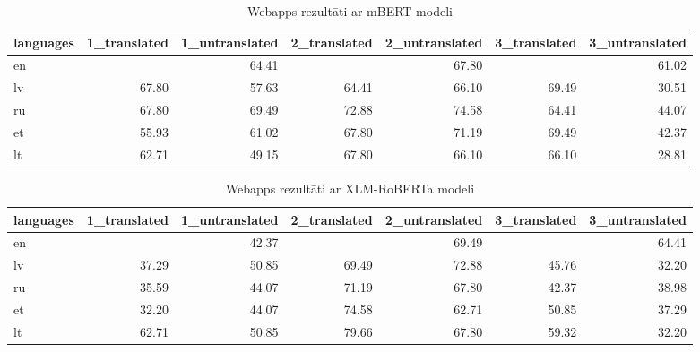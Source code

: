 \begin{table}[htbp]
  \centering
  \caption{Webapps rezultāti ar mBERT modeli}
    \begin{tabular}{lrrrrrr}\toprule
    languages & 1\_translated & 1\_untranslated & 2\_translated & 2\_untranslated & 3\_translated & 3\_untranslated \\\midrule
    en    &       & \cellcolor[rgb]{ .984,  .961,  .973}64.41 &       & \cellcolor[rgb]{ .863,  .902,  .957}67.80 &       & \cellcolor[rgb]{ .984,  .906,  .918}61.02 \\
    lv    & \cellcolor[rgb]{ .863,  .902,  .957}67.80 & \cellcolor[rgb]{ .984,  .855,  .867}57.63 & \cellcolor[rgb]{ .984,  .961,  .973}64.41 & \cellcolor[rgb]{ .988,  .988,  1}66.10 & \cellcolor[rgb]{ .737,  .812,  .914}69.49 & \cellcolor[rgb]{ .973,  .435,  .443}30.51 \\
    ru    & \cellcolor[rgb]{ .863,  .902,  .957}67.80 & \cellcolor[rgb]{ .737,  .812,  .914}69.49 & \cellcolor[rgb]{ .482,  .631,  .824}72.88 & \cellcolor[rgb]{ .353,  .541,  .776}74.58 & \cellcolor[rgb]{ .984,  .961,  .973}64.41 & \cellcolor[rgb]{ .976,  .647,  .655}44.07 \\
    et    & \cellcolor[rgb]{ .98,  .827,  .839}55.93 & \cellcolor[rgb]{ .984,  .906,  .918}61.02 & \cellcolor[rgb]{ .863,  .902,  .957}67.80 & \cellcolor[rgb]{ .608,  .722,  .867}71.19 & \cellcolor[rgb]{ .737,  .812,  .914}69.49 & \cellcolor[rgb]{ .976,  .62,  .627}42.37 \\
    lt    & \cellcolor[rgb]{ .984,  .933,  .945}62.71 & \cellcolor[rgb]{ .98,  .725,  .733}49.15 & \cellcolor[rgb]{ .863,  .902,  .957}67.80 & \cellcolor[rgb]{ .988,  .988,  1}66.10 & \cellcolor[rgb]{ .988,  .988,  1}66.10 & \cellcolor[rgb]{ .973,  .412,  .42}28.81 \\\bottomrule
    \end{tabular}%
  \label{tab:webapps-bert}%
\end{table}%


\begin{table}[htbp]
  \centering
  \caption{Webapps rezultāti ar XLM-RoBERTa modeli}
    \begin{tabular}{lrrrrrr}\toprule
    languages & 1\_translated & 1\_untranslated & 2\_translated & 2\_untranslated & 3\_translated & 3\_untranslated \\\midrule
    en    &       & 42.37 &       & 69.49 &       & 64.41 \\
    lv    & 37.29 & 50.85 & 69.49 & 72.88 & 45.76 & 32.20 \\
    ru    & 35.59 & 44.07 & 71.19 & 67.80 & 42.37 & 38.98 \\
    et    & 32.20 & 44.07 & 74.58 & 62.71 & 50.85 & 37.29 \\
    lt    & 62.71 & 50.85 & 79.66 & 67.80 & 59.32 & 32.20 \\\bottomrule
    \end{tabular}%
  \label{tab:webapps-xml}%
\end{table}%


